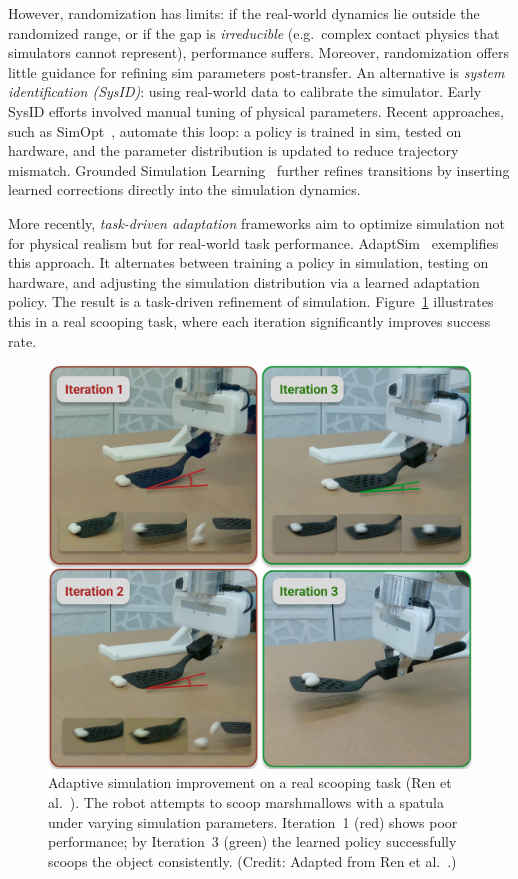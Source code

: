 However, randomization has limits: if the real-world dynamics lie outside the randomized range, or if the gap is \emph{irreducible} (e.g.\ complex contact physics that simulators cannot represent), performance suffers. Moreover, randomization offers little guidance for refining sim parameters post-transfer. An alternative is \emph{system identification (SysID)}: using real-world data to calibrate the simulator. Early SysID efforts involved manual tuning of physical parameters. Recent approaches, such as SimOpt~\cite{Chebotar2019}, automate this loop: a policy is trained in sim, tested on hardware, and the parameter distribution is updated to reduce trajectory mismatch. Grounded Simulation Learning~\cite{Hanna2017} further refines transitions by inserting learned corrections directly into the simulation dynamics.

More recently, \emph{task-driven adaptation} frameworks aim to optimize simulation not for physical realism but for real-world task performance. AdaptSim~\cite{Ren2023} exemplifies this approach. It alternates between training a policy in simulation, testing on hardware, and adjusting the simulation distribution via a learned adaptation policy. The result is a task-driven refinement of simulation. Figure~\ref{fig:adapt_sim} illustrates this in a real scooping task, where each iteration significantly improves success rate.

\begin{figure}[H]
    \centering
    \includegraphics[width=0.95\linewidth]{figures/figAdaptSim.png}
    \caption{Adaptive simulation improvement on a real scooping task (Ren et al.~\cite{Ren2023}). The robot attempts to scoop marshmallows with a spatula under varying simulation parameters. Iteration~1 (red) shows poor performance; by Iteration~3 (green) the learned policy successfully scoops the object consistently. (Credit: Adapted from Ren et al.~\cite{Ren2023}.)}
    \label{fig:adapt_sim}
\end{figure}

